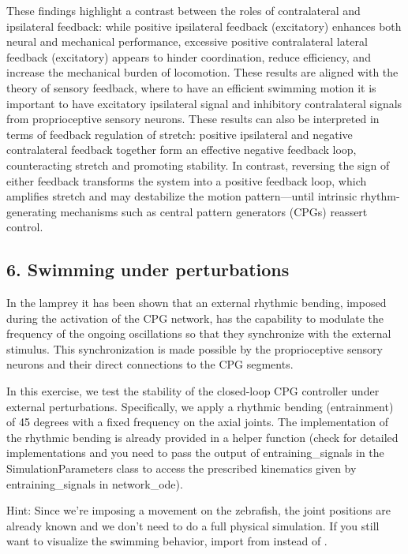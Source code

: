 \documentclass{cmc}
\begin{document}
These findings highlight a contrast between the roles of contralateral and ipsilateral feedback: while positive ipsilateral feedback (excitatory) enhances both neural and mechanical performance, excessive positive contralateral lateral feedback (excitatory) appears to hinder coordination, reduce efficiency, and increase the mechanical burden of locomotion. These results are aligned with the theory of sensory feedback, where to have an efficient swimming motion it is important to have excitatory ipsilateral signal and inhibitory contralateral signals from proprioceptive sensory neurons. These results can also be interpreted in terms of feedback regulation of stretch: positive ipsilateral and negative contralateral feedback together form an effective negative feedback loop, counteracting stretch and promoting stability. In contrast, reversing the sign of either feedback transforms the system into a positive feedback loop, which amplifies stretch and may destabilize the motion pattern—until intrinsic rhythm-generating mechanisms such as central pattern generators (CPGs) reassert control.


\subsection*{6. Swimming under perturbations}

In the lamprey it has been shown that an external rhythmic bending, imposed during the activation of the CPG network, has the capability to modulate the frequency of the ongoing oscillations so that they synchronize with the external stimulus. This synchronization is made possible by the proprioceptive sensory neurons and their direct connections to the CPG segments.

In this exercise, we test the stability of the closed-loop CPG controller under external perturbations. Specifically, we apply a rhythmic bending (entrainment) of 45 degrees with a fixed frequency on the axial joints. The implementation of the rhythmic bending is already provided in a helper function  (check  for detailed implementations and you need to pass the output of entraining\_signals in the SimulationParameters class to access the prescribed kinematics given by entraining\_signals in network\_ode).

Hint: Since we're imposing a movement on the zebrafish, the joint positions are already known and we don't need to do a full physical simulation.
If you still want to visualize the swimming behavior, import  from  instead of .
\end{document}
